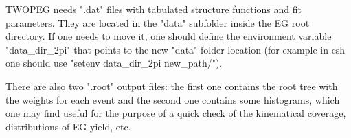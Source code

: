 TWOPEG needs ".dat" files with tabulated structure functions and fit parameters. They are located in the "data" subfolder inside the EG root directory. If one needs to move it, one should define the environment variable "data\_dir\_2pi" that points to the new "data" folder location (for example in csh one should use "setenv data\_dir\_2pi new\_path/").


There are also two ".root" output files: the first one contains the root tree with the weights for each event and the second one contains some histograms, which one may find useful for the purpose of a quick check of the kinematical coverage, distributions of EG yield, etc.
